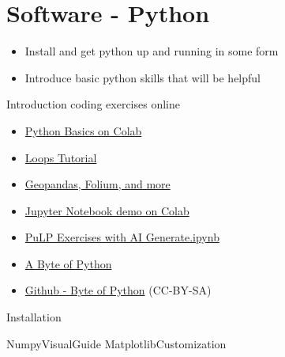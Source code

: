 \chapter{Software - Python}
\begin{outcome}
\begin{itemize}
\item Install and get python up and running in some form
\item Introduce basic python skills that will be helpful
\end{itemize}
\end{outcome}

\begin{resource}
Introduction coding exercises online
\begin{itemize}
\item \href{https://colab.research.google.com/drive/1dqQSVfNMchIbk0k4OByve0muZeyvih6j?usp=sharing}{Python Basics on Colab}
\item \href{https://colab.research.google.com/drive/1Ma8tQw6LU0NCF3jY62v7FAmXJOxbSph_?usp=sharing}{Loops Tutorial}
\item \href{https://colab.research.google.com/drive/1b5Cvfl1sGYb0YBUE75uTLLX4aO8mSXcQ?usp=sharing}{Geopandas, Folium, and more}
\item \href{https://colab.research.google.com/drive/1nn43ay5zCq9KVPlpUeuyFPex2Q73FvxI?usp=sharing}{Jupyter Notebook demo on Colab}
\item \href{https://colab.research.google.com/drive/1paYp36cHf_EvZcMYfD-dN1TtJ_abkpM2?usp=sharing}{PuLP Exercises with AI Generate.ipynb}
\end{itemize}

\begin{itemize}
\item\href{https://open.umn.edu/opentextbooks/textbooks/a-byte-of-python}{A Byte of Python}
\item\href{https://github.com/swaroopch/byte-of-python}{Github - Byte of Python} (CC-BY-SA)
\end{itemize}
\end{resource}



{Installation} 




{NumpyVisualGuide} %
{MatplotlibCustomization} %

